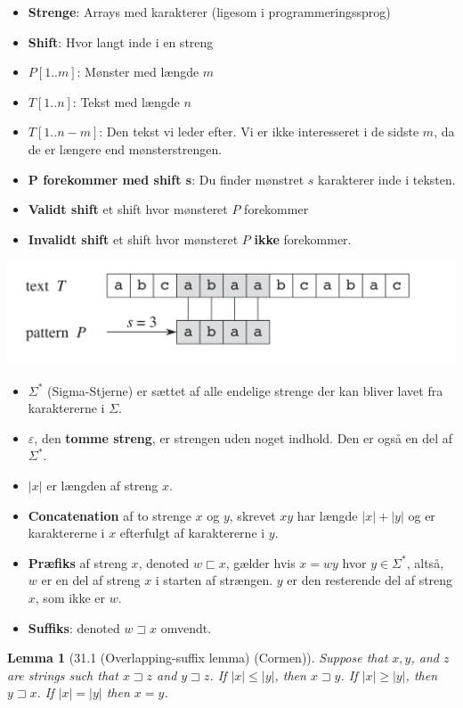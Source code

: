 \documentclass[11pt]{article}
\newtheorem{lemma}[theorem]{Lemma}
\theoremstyle{definition}
\theoremstyle{remark}
\begin{document}
\begin{itemize}
\item \textbf{Strenge}: Arrays med karakterer (ligesom i programmeringssprog)
\item \textbf{Shift}: Hvor langt inde i en streng
\item $P[1..m]$: Mønster med længde $m$
\item $T[1..n]$: Tekst med længde $n$
\item $T[1..n-m]$: Den tekst vi leder efter. Vi er ikke interesseret i de sidste $m$, da de er længere end mønsterstrengen.
\item \textbf{P forekommer med shift s}: Du finder mønstret $s$ karakterer inde i teksten.
\item \textbf{Validt shift} et shift hvor mønsteret $P$ forekommer
\item \textbf{Invalidt shift} et shift hvor mønsteret $P$ \textbf{ikke} forekommer. 
\end{itemize}
\includegraphics[width=400pt]{main--string-matching--notation-81a7.png}

\begin{itemize}
\item $\Sigma^{*}$ (Sigma-Stjerne) er sættet af alle endelige strenge der kan bliver lavet fra karaktererne i $\Sigma$. 
\item $\varepsilon$, den \textbf{tomme streng}, er strengen uden noget indhold. Den er også en del af $\Sigma^{*}$.
\item $|x|$ er længden af streng $x$. 
\item \textbf{Concatenation} af to strenge $x$ og $y$, skrevet $xy$ har længde $|x| + |y|$ og er karaktererne i $x$ efterfulgt af karaktererne i $y$.
\item \textbf{Præfiks} af streng $x$, denoted $w \sqsubset x$, gælder hvis $x = wy$ hvor $y \in \Sigma^{*}$, altså, $w$ er en del af streng $x$ i starten af strængen. $y$ er den resterende del af streng $x$, som ikke er $w$.
\item \textbf{Suffiks}: denoted $w \sqsupset x$ omvendt. 
\end{itemize}

\begin{lemma}[31.1 (Overlapping-suffix lemma) (Cormen)]
Suppose that $x,y$, and $z$ are strings such that $x \sqsupset z$ and $y \sqsupset z$. If $|x| \leq |y|$, then $x \sqsupset y$. If $|x| \geq |y|$, then $y \sqsupset x$. If $|x| = |y|$ then $x = y$.
\end{lemma}
\end{document}
